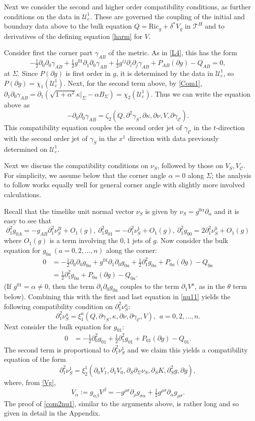 \documentclass[10pt]{amsart}
\renewcommand{\a}{\alpha}
\renewcommand{\b}{\beta}
\newcommand{\g}{\gamma}
\renewcommand{\d}{\delta}
\newcommand{\s}{\sigma}
\newcommand{\Si}{\Sigma}
\renewcommand{\k}{\kappa}
\newcommand{\cC}{{\mathcal C}}
\newcommand{\cT}{{\mathcal T}}
\newcommand{\cU}{{\mathcal U}}
\newcommand{\Ric}{\mathrm{Ric}}
\newcommand{\be}{\begin{equation}}
\newcommand{\ee}{\end{equation}}
\newcommand{\bes}{\begin{equation*}}
\newcommand{\ees}{\end{equation*}}
\newcommand{\p}{\partial}
\newcommand{\<}{\langle}
\renewcommand{\>}{\rangle}
\theoremstyle{plain}
\theoremstyle{remark}
\theoremstyle{definition}
\numberwithin{equation}{section}
\begin{document}
  Next we consider the second and higher order compatibility conditions, as further conditions on the data in $\cU_c^1$. These are governed the coupling of the 
initial and boundary data above to the bulk equation $Q = \Ric_g + \d^*V_g$ in $\cT^H$ and to derivatives of the defining equation \eqref{harm} for $V$. 

Consider first the corner part $\g_{AB}$ of the metric. As in \eqref{L4}, this has the form 
$$-\tfrac{1}{2}\p_0\p_0 \g_{AB} + \tfrac{1}{2}g^{01}\p_{1}\p_0 \g_{AB} + \tfrac{1}{2}g^{ij}\p_i\p_j \g_{AB} + P_{AB}(\p g) - Q_{AB} = 0,$$
at $\Si$. Since $P(\p g)$ is first order in $g$, it is determined by the data in $\cU_c^1$, so $P(\p g) = \chi_1(\cU_c^1)$. Next, for the second term above, 
by \eqref{Com1}, $\p_1 \p_0 \g_{AB} = \p_{1}(\sqrt{1+\a^2}\k |_{\Si} - \a B_{\Si}) = \chi_2(\cU_c^1)$. Thus we can write the equation above as 
\be \label{com2g}
-\p_0\p_0 \g_{AB}  = \zeta_2(Q, \p^2\g_S, \p \k, \p \nu, V, \p \g_{\cC}). 
\ee
This compatibility equation couples the second order jet of $\g_{\cC}$ in the $t$-direction with the second order jet of $\g_S$ in the $x^1$ direction with data previously 
determined on $\cU_c^1$. 

  Next we discuss the compatibility conditions on $\nu_S$, followed by those on $V_S, V_\cC$. For simplicity, we assume below that the corner angle $\a=0$ along $\Si$; 
the analysis to follow works equally well for general corner angle with slightly more involved calculations. 

Recall that the timelike unit normal vector $\nu_S$ is given by $\nu_S = g^{0\a}\p_{\a}$ and it is easy to see that 
\be\label{nu11}
\p_1^2g_{0A}=-g_{AB}\p_1^2 \nu_S^B+O_1(g), \ \p_1^2 g_{01}=-\p_1^2\nu_S^1+O_1(g), \ \p_1^2 g_{00}={2}\p_1^2\nu_S^0+O_1(g)
\ee
where $O_1( g)$ is a term involving the $0,1$ jets of $g$. Now consider the bulk equation for $g_{0a}~(a=0,2, \dots, n)$ along the corner:
\bes
\begin{split}
0&=-\tfrac{1}{2}\p_0\p_0 g_{0a} +g^{01}\p_{1}\p_0g_{0a}  +\tfrac{1}{2}\p_1^2 g_{0a}+ P_{0a}(\p g) - Q_{0a} \\
&=\tfrac{1}{2}\p_1^2 g_{0a}+ P_{0a}(\p g) - Q_{0a}.
\end{split}
\ees
(If $g^{01} = \a \neq 0$, then the term $\p_1\p_0 g_{0a}$ couples to the term $\p_1 V^a$, as in the $\theta$ term below). 
Combining this with the first and last equation in \eqref{nu11} yields the following compatibility condition on $\p^2_1\nu_S^a$:
\be\label{com2nua}
\p^2_1\nu_S^a = \xi_1^a(Q,\p \g_S, \k,\p\nu,\p \g_\cC, V), \ \ a=0,2,\dots, n.
\ee
Next consider the bulk equation for $g_{01}$:
\be\label{b01}
\begin{split}
0&=-\tfrac{1}{2}\p_0^2 g_{01}  +\tfrac{1}{2}\p_1^2 g_{01}+ P_{01}(\p g) - Q_{01}. 
\end{split}
\ee
The second term is proportional to $\p_1^2 \nu_S^1$ and we claim this yields a compatibility equation of the form 
\be\label{com2nu1}
\p_1^2\nu_S^1=\xi_2^1(\p_0 V_1,\p_1 V_0,\p_S\p_\Si \nu_S, \p_S K, \p_S^2 g, \p g),
\ee
where, from \eqref{Vg},  
\be\label{Vgf}
V_\a:=g_{\a\b}V^\b=-g^{\rho\s}\p_\rho g_{\s\a}+\tfrac{1}{2}g^{\rho\s}\p_\a g_{\rho\s}.
\ee
The proof of \eqref{com2nu1}, similar to the arguments above, is rather long and so given in detail in the Appendix. 
\end{document}
